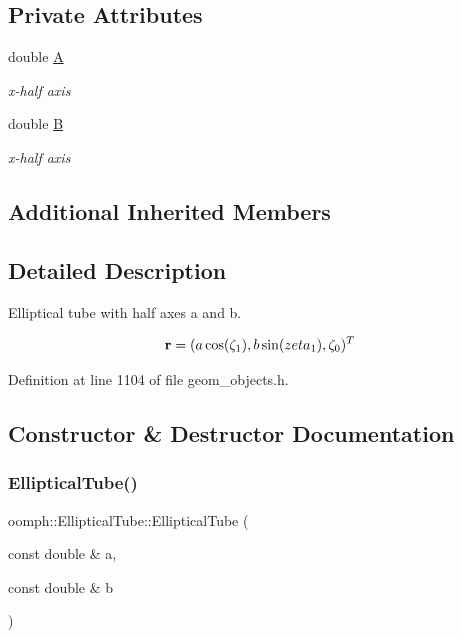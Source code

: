 \subsection*{Private Attributes}
\begin{DoxyCompactItemize}
\item 
double \hyperlink{classoomph_1_1EllipticalTube_a419f48b14f3e3bc1c884983fc3a7b2ae}{A}
\begin{DoxyCompactList}\small\item\em x-\/half axis \end{DoxyCompactList}\item 
double \hyperlink{classoomph_1_1EllipticalTube_a07babc26d001d03e9048bd3bae1581c1}{B}
\begin{DoxyCompactList}\small\item\em x-\/half axis \end{DoxyCompactList}\end{DoxyCompactItemize}
\subsection*{Additional Inherited Members}


\subsection{Detailed Description}
Elliptical tube with half axes a and b. 

\[ {\bf r} = ( a \cos(\zeta_1), b \sin(zeta_1), \zeta_0)^T \] 

Definition at line 1104 of file geom\+\_\+objects.\+h.



\subsection{Constructor \& Destructor Documentation}
\mbox{\label{classoomph_1_1EllipticalTube_a329dbc27caf2d9bfe02ad5e940b17aa6}} 
\subsubsection{\texorpdfstring{Elliptical\+Tube()}{EllipticalTube()}\hspace{0.1cm}{\footnotesize\ttfamily [1/2]}}
{\footnotesize\ttfamily oomph\+::\+Elliptical\+Tube\+::\+Elliptical\+Tube (\begin{DoxyParamCaption}\item[{const double \&}]{a,  }\item[{const double \&}]{b }\end{DoxyParamCaption})\hspace{0.3cm}{\ttfamily [inline]}}



